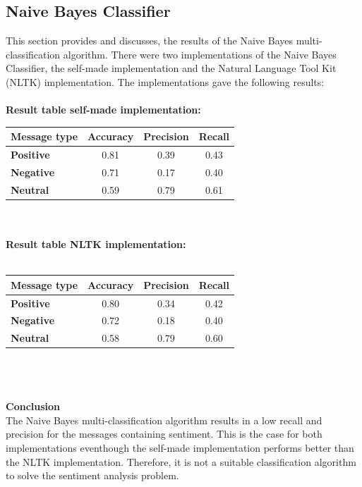 \documentclass[11pt]{article}
\begin{document}
\subsection{Naive Bayes Classifier}
This section provides and discusses, the results of the Naive Bayes multi-classification algorithm. There were two implementations of the Naive Bayes Classifier, the self-made implementation and the Natural Language Tool Kit (NLTK) implementation. The implementations gave the following results:\\\\
\textbf{Result table self-made implementation:}\\
\begin{tabular}{| l || c | c | c |}
\hline
\textbf{Message type} & \textbf{Accuracy} & \textbf{Precision} & \textbf{Recall}\\
\hline \hline
\textbf{Positive} & 0.81 & 0.39 & 0.43\\
\hline
\textbf{Negative} & 0.71 & 0.17 & 0.40\\
\hline
\textbf{Neutral}  & 0.59 & 0.79 & 0.61\\
\hline
\end{tabular}\\\\
\textbf{Result table NLTK implementation:}\\\\
\begin{tabular}{| l || c | c | c |}
\hline
\textbf{Message type} & \textbf{Accuracy} & \textbf{Precision} & \textbf{Recall}\\
\hline \hline
\textbf{Positive} & 0.80 & 0.34 & 0.42\\
\hline
\textbf{Negative} & 0.72 & 0.18 & 0.40\\
\hline
\textbf{Neutral}  & 0.58 & 0.79 & 0.60\\
\hline
\end{tabular}\\\\\\
\textbf{Conclusion}\\
The Naive Bayes multi-classification algorithm results in a low recall and precision for the messages containing sentiment. This is the case for both implementations eventhough the self-made implementation performs better than the NLTK implementation. Therefore, it is not a suitable classification algorithm to solve the sentiment analysis problem.
\end{document}
